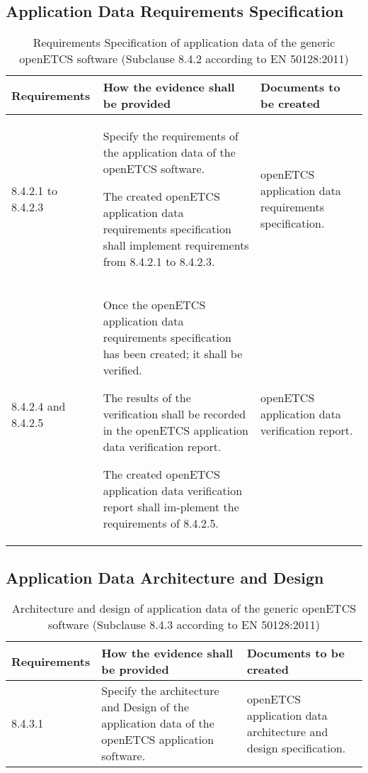 \documentclass{template/openetcs_report}
\begin{document}
\subsection{Application Data Requirements Specification}
{\footnotesize\sffamily\centering
\begin{longtable}{|p{2cm}|p{9cm}|p{3cm}|}
\caption{Requirements Specification of application data of the generic openETCS software (Subclause 8.4.2 according to EN 50128:2011)}\\
\hline
\bfseries Requirements & \bfseries How the evidence shall be provided & \bfseries Documents to be created\\
\hline
\hline
\endhead
\hline
\endfoot

8.4.2.1 to 8.4.2.3 & Specify the requirements of the  application data of the openETCS software.

The created openETCS application data requirements specification shall implement requirements from 8.4.2.1 to 8.4.2.3.
& openETCS application data requirements specification.\\ 
\hline
8.4.2.4 and 8.4.2.5 & Once the openETCS application data requirements specification has been created; it shall be verified.

The results of the verification shall be recorded in the openETCS application data verification report.

The created openETCS application data verification report shall im-plement the requirements of 8.4.2.5.
& openETCS application data verification report.\\ 
\hline
\end{longtable}}


\subsection{Application Data Architecture and Design}
{\footnotesize\sffamily\centering
\begin{longtable}{|p{2cm}|p{9cm}|p{3cm}|}
\caption{Architecture and design of application data of the generic openETCS software (Subclause 8.4.3 according to EN 50128:2011)}\\
\hline
\bfseries Requirements & \bfseries How the evidence shall be provided & \bfseries Documents to be created\\
\hline
\hline
\endhead
\hline
\endfoot

8.4.3.1  & Specify the architecture and Design of the application data of the openETCS application software.
& openETCS application data architecture and design specification.\\ 
\hline
\end{longtable}}
\end{document}
